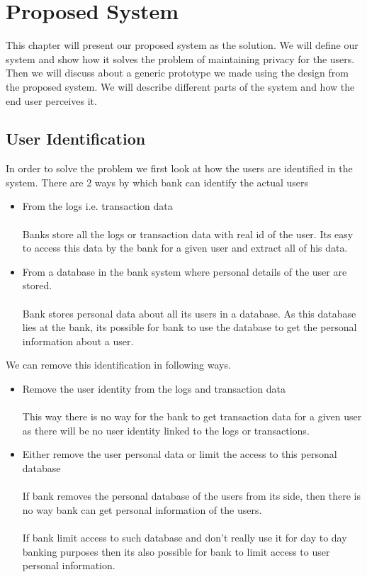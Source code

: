 \chapter{Proposed System}

This chapter will present our proposed system as the solution. We will define our system and show how it solves the problem of maintaining privacy for the users. Then we will discuss about a generic prototype we made using the design from the proposed system. We will describe different parts of the system and how the end user perceives it.
\section{User Identification}
In order to solve the problem we first look at how the users are identified in the system. There are 2 ways by which bank can identify the actual users
\begin{itemize}
	\item From the logs i.e. transaction data
\\
\\Banks store all the logs or transaction data with real id of the user. Its easy to access this data by the bank for a given user and extract all of his data.
	\item From a database in the bank system where personal details of the user are stored.	
\\
\\Bank stores personal data about all its users in a database. As this database lies at the bank, its possible for bank to use the database to get the personal information about a user.
\end{itemize}
We can remove this identification in following ways.
\begin{itemize}
	\item Remove the user identity from the logs and transaction data
\\
\\This way there is no way for the bank to get transaction data for a given user as there will be no user identity linked to the logs or transactions.
	\item Either remove the user personal data or limit the access to this personal database
\\
\\If bank removes the personal database of the users from its side, then there is no way bank can get personal information of the users.
\\
\\If bank limit access to such database and don't really use it for day to day banking purposes then its also possible for bank to limit access to user personal information.
\end{itemize}
